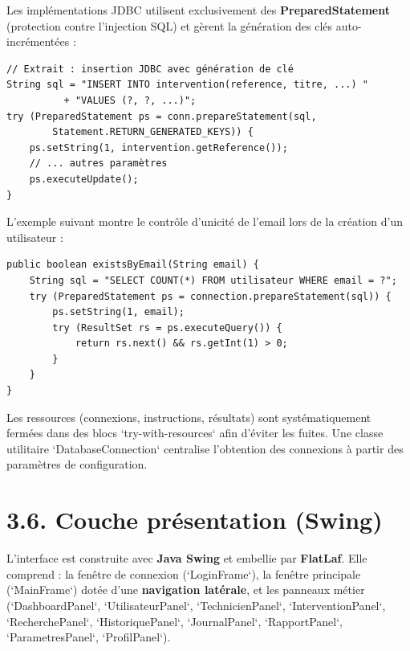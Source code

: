 \documentclass[11pt,a4paper]{report}
\begin{document}
Les implémentations JDBC utilisent exclusivement des \textbf{PreparedStatement} (protection contre l'injection SQL) et gèrent la génération des clés auto-incrémentées :
\begin{lstlisting}
// Extrait : insertion JDBC avec génération de clé
String sql = "INSERT INTO intervention(reference, titre, ...) "
          + "VALUES (?, ?, ...)";
try (PreparedStatement ps = conn.prepareStatement(sql,
        Statement.RETURN_GENERATED_KEYS)) {
    ps.setString(1, intervention.getReference());
    // ... autres paramètres
    ps.executeUpdate();
}
\end{lstlisting}

L'exemple suivant montre le contrôle d'unicité de l'email lors de la création d'un utilisateur :
\begin{lstlisting}
public boolean existsByEmail(String email) {
    String sql = "SELECT COUNT(*) FROM utilisateur WHERE email = ?";
    try (PreparedStatement ps = connection.prepareStatement(sql)) {
        ps.setString(1, email);
        try (ResultSet rs = ps.executeQuery()) {
            return rs.next() && rs.getInt(1) > 0;
        }
    }
}
\end{lstlisting}

Les ressources (connexions, instructions, résultats) sont systématiquement fermées dans des blocs `try-with-resources` afin d'éviter les fuites. Une classe utilitaire `DatabaseConnection` centralise l'obtention des connexions à partir des paramètres de configuration.
\section*{3.6. Couche présentation (Swing)}

L'interface est construite avec \textbf{Java Swing} et embellie par \textbf{FlatLaf}. Elle comprend : la fenêtre de connexion (`LoginFrame`), la fenêtre principale (`MainFrame`) dotée d'une \textbf{navigation latérale}, et les panneaux métier (`DashboardPanel`, `UtilisateurPanel`, `TechnicienPanel`, `InterventionPanel`, `RecherchePanel`, `HistoriquePanel`, `JournalPanel`, `RapportPanel`, `ParametresPanel`, `ProfilPanel`).
\end{document}
